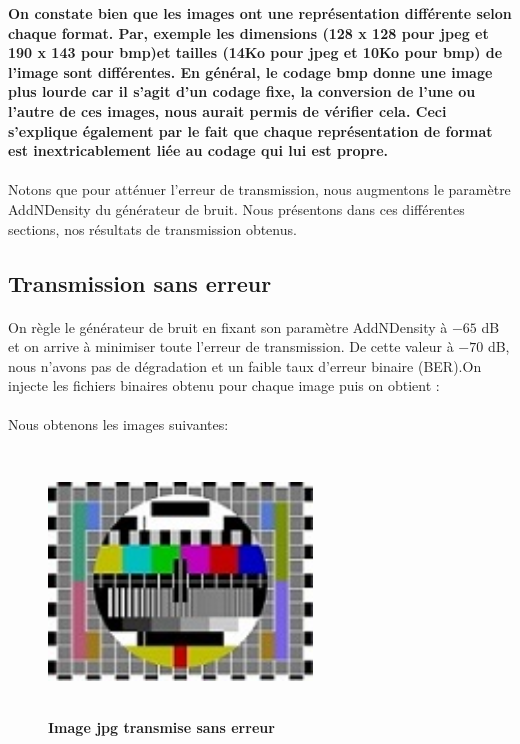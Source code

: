\textbf{On constate bien que les images ont une représentation différente selon chaque format. Par, exemple les dimensions (128 x 128 pour jpeg et 190 x 143 pour bmp)et tailles (14Ko pour jpeg et 10Ko pour bmp) de l'image sont différentes. En général, le codage bmp donne une image plus lourde car il s'agit d'un codage fixe, la conversion de l'une ou l'autre de ces images, nous aurait permis de vérifier cela. Ceci s'explique également par le fait que chaque représentation de format est inextricablement liée au codage qui lui est propre.}

\paragraph{}
Notons que pour atténuer l'erreur de transmission, nous augmentons le paramètre AddNDensity du générateur de bruit. Nous présentons dans ces différentes sections, nos résultats de transmission obtenus.


\subsection{Transmission sans erreur}
\paragraph{}
On règle le générateur de bruit en fixant son paramètre AddNDensity à $- 65$ dB et on arrive à minimiser toute l'erreur de transmission. De cette valeur à $- 70$ dB, nous n'avons pas de dégradation et un faible taux d'erreur binaire (BER).On injecte les fichiers binaires obtenu pour chaque image puis on obtient :


\paragraph{}
Nous obtenons les images suivantes:


\begin{figure}[bth]%
\begin{center}
\includegraphics[height=70mm,width=70mm]{test_jpeg}%
\caption{\textbf{Image jpg transmise sans erreur}}%
\label{jpgsserr}%
\end {center}
\end{figure}

